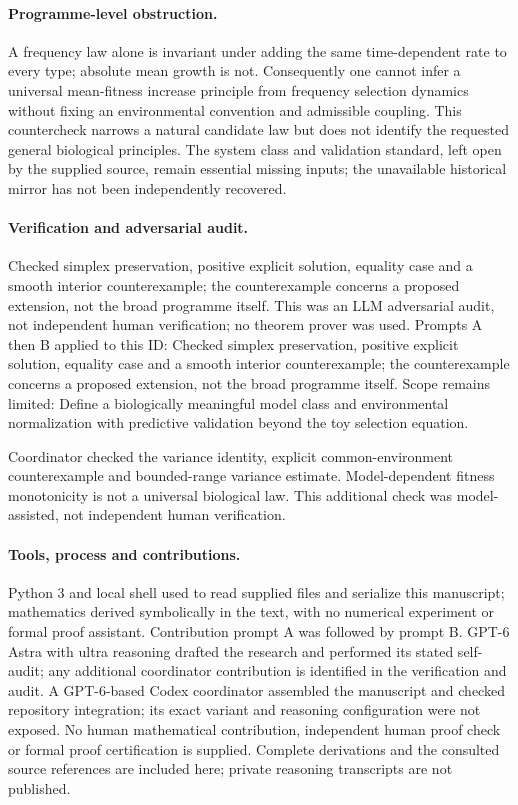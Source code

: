 \documentclass[11pt]{article}
\begin{document}
\paragraph{Programme-level obstruction.}A frequency law alone is invariant under adding the same time-dependent rate to every type; absolute mean growth is not. Consequently one cannot infer a universal mean-fitness increase principle from frequency selection dynamics without fixing an environmental convention and admissible coupling. This countercheck narrows a natural candidate law but does not identify the requested general biological principles. The system class and validation standard, left open by the supplied source, remain essential missing inputs; the unavailable historical mirror has not been independently recovered.

\paragraph{Verification and adversarial audit.}
Checked simplex preservation, positive explicit solution, equality case and a smooth interior counterexample; the counterexample concerns a proposed extension, not the broad programme itself. This was an LLM adversarial audit, not independent human verification; no theorem prover was used. Prompts A then B applied to this ID: Checked simplex preservation, positive explicit solution, equality case and a smooth interior counterexample; the counterexample concerns a proposed extension, not the broad programme itself. Scope remains limited: Define a biologically meaningful model class and environmental normalization with predictive validation beyond the toy selection equation.

Coordinator checked the variance identity, explicit common-environment counterexample and bounded-range variance estimate. Model-dependent fitness monotonicity is not a universal biological law. This additional check was model-assisted, not independent human verification.

\paragraph{Tools, process and contributions.}
Python 3 and local shell used to read supplied files and serialize this manuscript; mathematics derived symbolically in the text, with no numerical experiment or formal proof assistant. Contribution prompt A was followed by prompt B. GPT-6 Astra with ultra reasoning drafted the research and performed its stated self-audit; any additional coordinator contribution is identified in the verification and audit. A GPT-6-based Codex coordinator assembled the manuscript and checked repository integration; its exact variant and reasoning configuration were not exposed. No human mathematical contribution, independent human proof check or formal proof certification is supplied. Complete derivations and the consulted source references are included here; private reasoning transcripts are not published.
\end{document}

